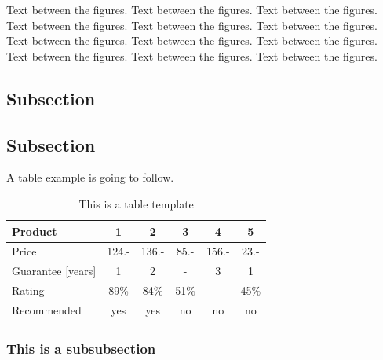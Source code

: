 Text between the figures.  Text between the figures. Text between the figures. Text between the figures.  Text between the figures. Text between the figures. Text between the figures.  Text between the figures. Text between the figures. Text between the figures.  Text between the figures. Text between the figures.

\subsection{Subsection}

\subsection{Subsection}

A table example is going to follow.

\begin{table}[H]
\centering
\caption{This is a table template}
\begin{tabular}{|l|c|c|c|c|c|}
\hline
Product & 1 & 2 & 3 & 4 & 5\\
\hline
Price & 124.- & 136.- & 85.- & 156.- & 23.-\\
Guarantee [years] & 1 & 2 & - & 3 & 1\\
Rating & 89\% & 84\% & 51\% & & 45\%\\
\hline
\hline
Recommended & yes & yes & no & no & no\\
\hline
\end{tabular}
\label{tab:template2}
\end{table}
\subsubsection{This is a subsubsection}

